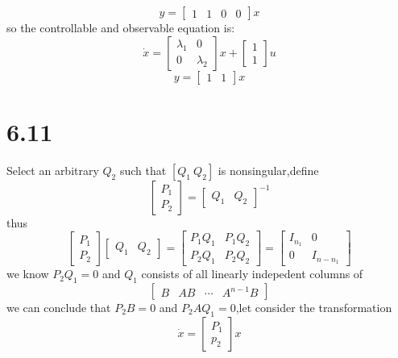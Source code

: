 \documentclass{article}
\begin{document}
\[
y=
\left[
    \begin{array}{cccc}
        1 & 1 & 0 & 0
    \end{array}
\right]x
\]
so the controllable and observable equation is:
\[
\dot{x}=
\left[
    \begin{array}{cc}
        \lambda_1 & 0\\
        0 & \lambda_2
    \end{array}
\right]x+
\left[
    \begin{array}{c}
        1\\
        1
    \end{array}
\right]u
\]
\[
y=
\left[
    \begin{array}{cc}
        1 & 1
    \end{array}
\right]x    
\]

\section*{6.11}
Select an arbitrary $Q_2$ such that $[Q_1\ Q_2]$ is nonsingular,define 
\[
\left[
    \begin{array}{c}
    P_1\\
    P_2
    \end{array}
\right]=
\left[
    \begin{array}{cc}
        Q_1 & Q_2
    \end{array}
\right]^{-1}
\]
thus
\[
\left[
    \begin{array}{c}
    P_1\\
    P_2
    \end{array}
\right]
\left[
    \begin{array}{cc}
        Q_1 & Q_2
    \end{array}
\right]=
\left[
    \begin{array}{cc}
        P_1Q_1 & P_1Q_2\\
        P_2Q_1 & P_2Q_2
    \end{array}
\right]
=
\left[
    \begin{array}{cc}
        I_{n_1} & 0\\
        0 & I_{n-n_1}
    \end{array}
\right]
\]
we know $P_2Q_1=0$ and $Q_1$ consists of all linearly indepedent columns of 
\[
\left[
    \begin{array}{cccc}
        B & AB &\cdots & A^{n-1}B
    \end{array}
\right]    
\]
we can conclude that $P_2B=0$ and $P_2AQ_1=0$,let consider the transformation 
\[
\dot{x}=
\left[
    \begin{array}{c}
        P_1\\
        p_2
    \end{array}
\right]x    
\]
\end{document}
